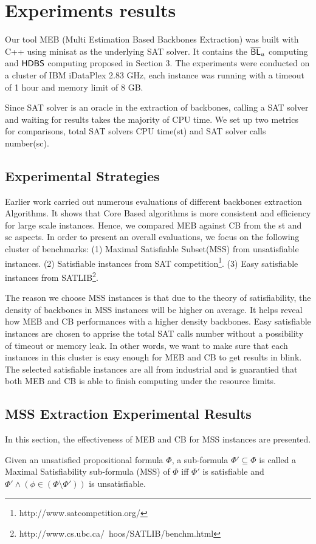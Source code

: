 \section{Experiments results}\label{sec:expr}

Our tool MEB (Multi Estimation Based Backbones Extraction) was built with C++ using minisat\cite{MINISAT} as the underlying SAT solver. It contains the $\overline{\textsf{BL}}_u$ computing and $\textsf{HDBS}$ computing proposed in Section 3. The experiments were conducted on a cluster of IBM iDataPlex 2.83 GHz, each instance was running with a timeout of 1 hour and memory limit of 8 GB.

Since SAT solver is an oracle in the extraction of backbones, calling a SAT solver and waiting for results takes the majority of CPU time. We set up two metrics for comparisons, total SAT solvers CPU time(st) and SAT solver calls number(sc).

\subsection{Experimental Strategies}

Earlier work\cite{JLM15} carried out numerous evaluations of different backbones extraction Algorithms. It shows that Core Based algorithms is more consistent and efficiency for large scale instances. Hence, we compared MEB against CB from the st and sc aspects.
In order to present an overall evaluations, we focus on the following cluster of benchmarks: (1) Maximal Satisfiable Subset(MSS) from unsatisfiable instances. (2) Satisfiable instances from SAT competition\footnote{http://www.satcompetition.org/}. (3) Easy satisfiable instances from SATLIB\footnote{http://www.cs.ubc.ca/~hoos/SATLIB/benchm.html}.

The reason we choose MSS instances is that due to the theory of satisfiability, the density of backbones in MSS instances will be higher on average. It helps reveal how MEB and CB performances with a higher density backbones.
Easy satisfiable instances are chosen to apprise the total SAT calls number without a possibility of timeout or memory leak. In other words, we want to make sure that each instances in this cluster is easy enough for MEB and CB to get results in blink.
The selected satisfiable instances are all from industrial and is guarantied that both MEB and CB is able to finish computing under the resource limits.

\subsection{MSS Extraction Experimental Results}
In this section, the effectiveness of MEB and CB for MSS instances are presented.
\begin{definition}
Given an unsatisfied propositional formula $\Phi$, a sub-formula $\Phi'\subseteq\Phi$ is called a Maximal Satisfiability sub-formula (MSS) of $\Phi$ iff $\Phi'$ is satisfiable and $\Phi'\wedge(\phi\in(\Phi\setminus\Phi'))$ is unsatisfiable.
\end{definition}

